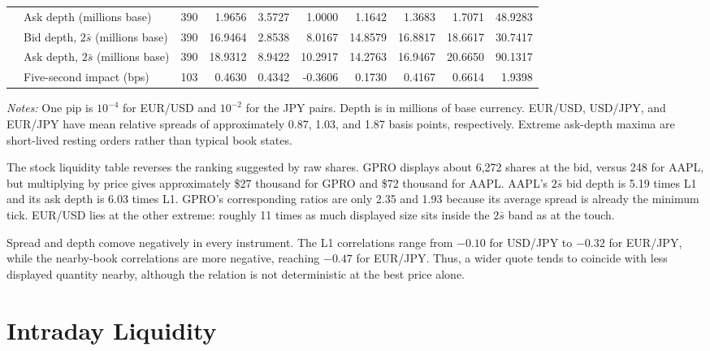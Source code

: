 \documentclass[11pt]{article}
\begin{document}
\begin{landscape}
\begin{table}[H]
\begin{threeparttable}
\begin{tabular}{@{}llrrrrrrrr@{}}
        & Ask depth (millions base) & 390 & 1.9656 & 3.5727 & 1.0000 & 1.1642 & 1.3683 & 1.7071 & 48.9283\\
        & Bid depth, $2\bar{s}$ (millions base) & 390 & 16.9464 & 2.8538 & 8.0167 & 14.8579 & 16.8817 & 18.6617 & 30.7417\\
        & Ask depth, $2\bar{s}$ (millions base) & 390 & 18.9312 & 8.9422 & 10.2917 & 14.2763 & 16.9467 & 20.6650 & 90.1317\\
        & Five-second impact (bps) & 103 & 0.4630 & 0.4342 & -0.3606 & 0.1730 & 0.4167 & 0.6614 & 1.9398\\
\bottomrule
\end{tabular}
\begin{tablenotes}[flushleft]\footnotesize
\item \textit{Notes:} One pip is $10^{-4}$ for EUR/USD and $10^{-2}$ for the JPY pairs. Depth is in millions of base currency. EUR/USD, USD/JPY, and EUR/JPY have mean relative spreads of approximately 0.87, 1.03, and 1.87 basis points, respectively. Extreme ask-depth maxima are short-lived resting orders rather than typical book states.
\end{tablenotes}
\end{threeparttable}
\end{table}
\end{landscape}

The stock liquidity table reverses the ranking suggested by raw shares. GPRO displays about 6,272 shares at the bid, versus 248 for AAPL, but multiplying by price gives approximately \$27 thousand for GPRO and \$72 thousand for AAPL. AAPL's $2\bar{s}$ bid depth is 5.19 times L1 and its ask depth is 6.03 times L1. GPRO's corresponding ratios are only 2.35 and 1.93 because its average spread is already the minimum tick. EUR/USD lies at the other extreme: roughly 11 times as much displayed size sits inside the $2\bar{s}$ band as at the touch.

Spread and depth comove negatively in every instrument. The L1 correlations range from $-0.10$ for USD/JPY to $-0.32$ for EUR/JPY, while the nearby-book correlations are more negative, reaching $-0.47$ for EUR/JPY. Thus, a wider quote tends to coincide with less displayed quantity nearby, although the relation is not deterministic at the best price alone.

\section{Intraday Liquidity}
\end{document}
